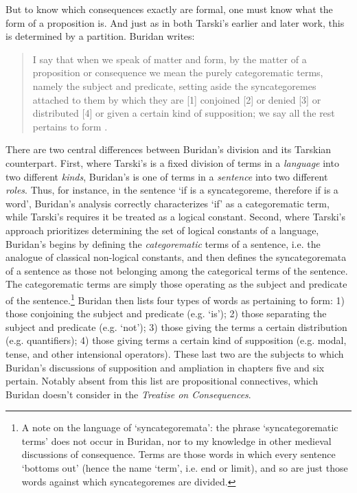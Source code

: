 \documentclass[]{article}
\begin{document}
But to know which consequences exactly are formal, one must know what the form of a proposition is. And just as in both Tarski's earlier and later work, this is determined by a partition. Buridan writes:

\begin{quote}
	I say that when we speak of matter and form, by the matter of a proposition or consequence we mean the purely categorematic terms, namely the subject and predicate, setting aside the syncategoremes attached to them by which they are [1] conjoined [2] or denied [3] or distributed [4] or given a certain kind of supposition; we say all the rest pertains to form \autocite[I. 7, 74]{Buridan2015}.
\end{quote}

There are two central differences between Buridan's division and its Tarskian counterpart. First, where Tarski's is a fixed division of terms in a \textit{language} into two different \textit{kinds}, Buridan's is one of terms in a \textit{sentence} into two different \textit{roles}. Thus, for instance, in the sentence `if is a syncategoreme, therefore if is a word', Buridan's analysis correctly characterizes `if' as a categorematic term, while Tarski's requires it be treated as a logical constant. Second, where Tarski's approach prioritizes determining the set of logical constants of a language, Buridan's begins by defining the \textit{categorematic} terms of a sentence, i.e. the analogue of classical non-logical constants, and then defines the syncategoremata of a sentence as those not belonging among the categorical terms of the sentence. The categorematic terms are simply those operating as the subject and predicate of the sentence.\footnote{A note on the language of `syncategoremata': the phrase `syncategorematic terms' does not occur in Buridan, nor to my knowledge in other medieval discussions of consequence. Terms are those words in which every sentence `bottoms out' (hence the name `term', i.e. end or limit), and so are just those words against which syncategoremes are divided.} Buridan then lists four types of words as pertaining to form: 1) those conjoining the subject and predicate (e.g. `is'); 2) those separating the subject and predicate (e.g. `not'); 3) those giving the terms a certain distribution (e.g. quantifiers); 4) those giving terms a certain kind of supposition (e.g. modal, tense, and other intensional operators). These last two are the subjects to which Buridan's discussions of supposition and ampliation in chapters five and six pertain. Notably absent from this list are propositional connectives, which Buridan doesn't consider in the \textit{Treatise on Consequences}.
\end{document}
